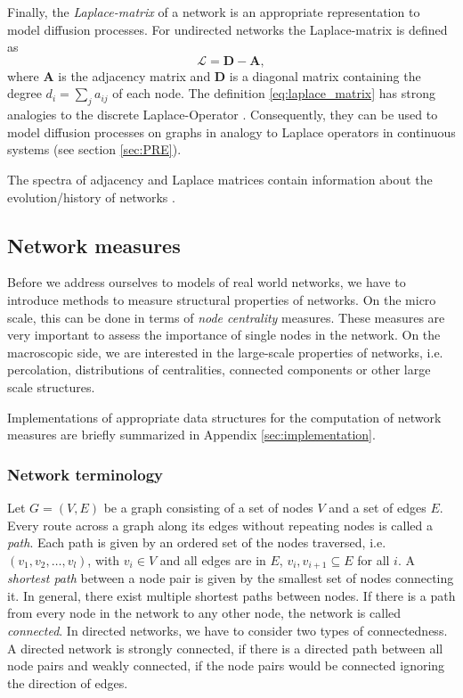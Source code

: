 Finally, the \emph{Laplace-matrix} of a network is an appropriate representation to model diffusion processes.
For undirected networks the Laplace-matrix is defined as
\begin{equation}\label{eq:laplace_matrix}
\mathcal{L}=\mathbf{D}-\mathbf{A},
\end{equation}
where $\mathbf{A}$ is the adjacency matrix and $\mathbf{D}$ is a diagonal matrix containing the degree $d_i=\sum _j a_{ij}$ of each node.
The definition \eqref{eq:laplace_matrix} has strong analogies to the discrete Laplace-Operator \citep{Press:1992}.
Consequently, they can be used to model diffusion processes on graphs in analogy to Laplace operators in continuous systems (see section \ref{sec:PRE}).

The spectra of adjacency and Laplace matrices contain information about the evolution/history of networks \citep{Banerjee2009}.


\subsection{Network measures}\label{sec:network_measures}
Before we address ourselves to models of real world networks, we have to introduce methods to measure structural properties of networks.
On the micro scale, this can be done in terms of \emph{node centrality} measures.
These measures are very important to assess the importance of single nodes in the network.
On the macroscopic side, we are interested in the large-scale properties of networks, i.e. percolation, distributions of centralities, connected components or other large scale structures.

Implementations of appropriate data structures for the computation of network measures are briefly summarized in Appendix \ref{sec:implementation}.

\subsubsection{Network terminology}\label{sec:network_terminology}
Let $G=(V,E)$ be a graph consisting of a set of nodes $V$ and a set of edges $E$.
Every route across a graph along its edges without repeating nodes is called a \emph{path}.
Each path is given by an ordered set of the nodes traversed, i.e. $(v_1,v_2,\dots ,v_l)$, with $v_i \in V$ and all edges are in $E$, $v_i,v_{i+1} \subseteq E$ for all $i$.
A \emph{shortest path} between a node pair is given by the smallest set of nodes connecting it.
In general, there exist multiple shortest paths between nodes.
If there is a path from every node in the network to any other node, the network is called \emph{connected}.
In directed networks, we have to consider two types of connectedness.
A directed network is strongly connected, if there is a directed path between all node pairs and weakly connected, if the node pairs would be connected ignoring the direction of edges.

